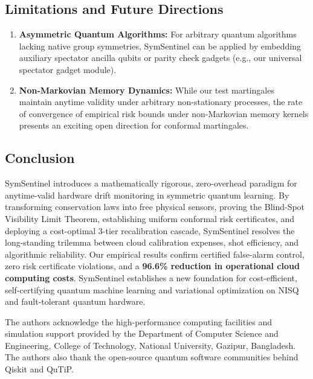 \documentclass[aps,pra,twocolumn,superscriptaddress,10pt,floatfix]{revtex4-2}
\begin{document}
\subsection{Limitations and Future Directions}
\begin{enumerate}
    \item \textbf{Asymmetric Quantum Algorithms:} For arbitrary quantum algorithms lacking native group symmetries, SymSentinel can be applied by embedding auxiliary spectator ancilla qubits or parity check gadgets (e.g., our universal spectator gadget module).
    \item \textbf{Non-Markovian Memory Dynamics:} While our test martingales maintain anytime validity under arbitrary non-stationary processes, the rate of convergence of empirical risk bounds under non-Markovian memory kernels presents an exciting open direction for conformal martingales.
\end{enumerate}

\subsection{Conclusion}
SymSentinel introduces a mathematically rigorous, zero-overhead paradigm for anytime-valid hardware drift monitoring in symmetric quantum learning. By transforming conservation laws into free physical sensors, proving the Blind-Spot Visibility Limit Theorem, establishing uniform conformal risk certificates, and deploying a cost-optimal 3-tier recalibration cascade, SymSentinel resolves the long-standing trilemma between cloud calibration expenses, shot efficiency, and algorithmic reliability. Our empirical results confirm certified false-alarm control, zero risk certificate violations, and a \textbf{96.6\% reduction in operational cloud computing costs}. SymSentinel establishes a new foundation for cost-efficient, self-certifying quantum machine learning and variational optimization on NISQ and fault-tolerant quantum hardware.

\begin{acknowledgments}
The authors acknowledge the high-performance computing facilities and simulation support provided by the Department of Computer Science and Engineering, College of Technology, National University, Gazipur, Bangladesh. The authors also thank the open-source quantum software communities behind Qiskit and QuTiP.
\end{acknowledgments}
\end{document}
